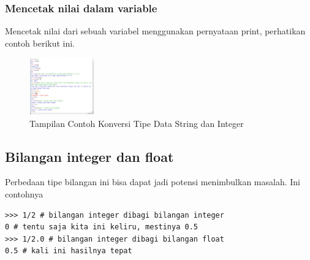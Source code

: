 \subsubsection{Mencetak nilai dalam variable} 
Mencetak nilai dari sebuah variabel menggunakan pernyataan print, perhatikan 
contoh berikut ini. 
\begin{figure}[ht]
    \centerline{\includegraphics[width=0.25\textwidth]{figures/konversi.png}}
    \caption{Tampilan Contoh Konversi Tipe Data String dan Integer}
    \label{Tipe Data String dan Integer}
    \end{figure}

\subsection{Bilangan integer dan float}
Perbedaan tipe bilangan ini bisa dapat jadi potensi menimbulkan masalah. 
Ini contohnya
\begin{verbatim}
>>> 1/2 # bilangan integer dibagi bilangan integer
0 # tentu saja kita ini keliru, mestinya 0.5
>>> 1/2.0 # bilangan integer dibagi bilangan float
0.5 # kali ini hasilnya tepat
\end{verbatim}

